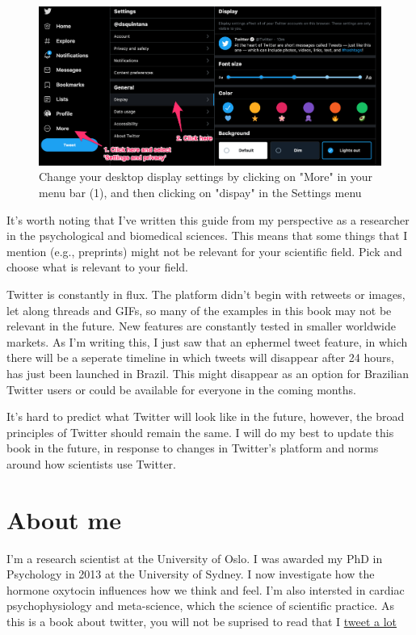 \documentclass[]{book}
\begin{document}
\begin{figure}

{\centering \includegraphics[width=0.8\linewidth]{images/display} 

}

\caption{Change your desktop display settings by clicking on "More" in your menu bar (1), and then clicking on "dispay" in the Settings menu}\label{fig:display}
\end{figure}

It's worth noting that I've written this guide from my perspective as a researcher in the psychological and biomedical sciences. This means that some things that I mention (e.g., preprints) might not be relevant for your scientific field. Pick and choose what is relevant to your field.

Twitter is constantly in flux. The platform didn't begin with retweets or images, let along threads and GIFs, so many of the examples in this book may not be relevant in the future. New features are constantly tested in smaller worldwide markets. As I'm writing this, I just saw that an ephermel tweet feature, in which there will be a seperate timeline in which tweets will disappear after 24 hours, has just been launched in Brazil. This might disappear as an option for Brazilian Twitter users or could be available for everyone in the coming months.

It's hard to predict what Twitter will look like in the future, however, the broad principles of Twitter should remain the same. I will do my best to update this book in the future, in response to changes in Twitter's platform and norms around how scientists use Twitter.

\hypertarget{about-me}{%
\section*{About me}\label{about-me}}

I'm a research scientist at the University of Oslo. I was awarded my PhD in Psychology in 2013 at the University of Sydney. I now investigate how the hormone oxytocin influences how we think and feel. I'm also intersted in cardiac psychophysiology and meta-science, which the science of scientific practice. As this is a book about twitter, you will not be suprised to read that I \href{https://twitter.com/dsquintana}{tweet a lot}
\end{document}
